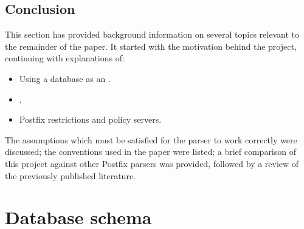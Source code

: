\documentclass[a4paper,12pt,draft]{article}
\begin{document}
%

\subsection{Conclusion}

This section has provided background information on several topics relevant
to the remainder of the paper.  It started with the motivation behind the
project, continuing with explanations of:

\begin{itemize}

    \item Using a database as an \API{}.

    \item \SMTP{}.

    \item Postfix restrictions and policy servers.

\end{itemize}

The assumptions which must be satisfied for the parser to work correctly
were discussed; the conventions used in the paper were listed; a brief
comparison of this project against other Postfix parsers was provided,
followed by a review of the previously published literature.

\section{Database schema}
\label{database schema}
\end{document}
